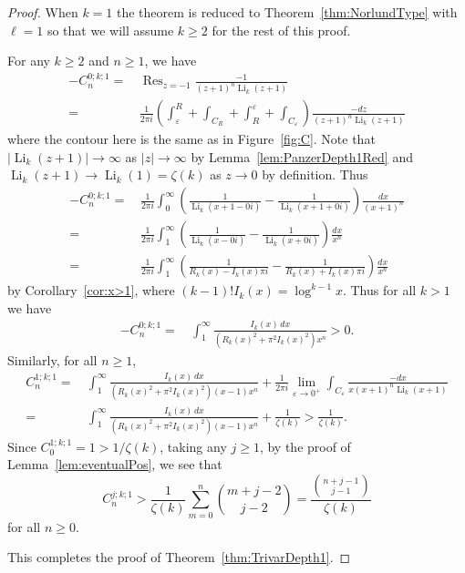 \documentclass[11pt]{article}
\newcommand\eps{{\varepsilon}}
\DeclareMathOperator{\Li}{Li}
\DeclareMathOperator{\Res}{Res}
\theoremstyle{plain}
\theoremstyle{definition}
\begin{document}
\begin{proof}
When $k=1$ the theorem is reduced to Theorem~\ref{thm:NorlundType} with $\ell=1$ so that we will assume $k\ge 2$ for the rest of this proof.

For any $k\ge 2$ and $n\ge 1$, we have
\begin{align*}
-C_{n}^{0;k;1}= &\, \Res_{z=-1} \frac{-1}{(z+1)^n\Li_k(z+1)}   \\
=&\, \frac{1}{2\pi i}\left( \int_\eps^R +\int_{C_R}+\int_R^\eps+ \int_{C_\eps} \right) \frac{-dz}{(z+1)^n\Li_k(z+1)}
\end{align*}
where the contour here is the same as in Figure~\ref{fig:C}. Note that $|\Li_k(z+1)|\to \infty$ as $|z|\to \infty$ by Lemma~\ref{lem:PanzerDepth1Red}
and $\Li_k(z+1)\to \Li_k(1)=\zeta(k)$ as $z\to 0$ by definition. Thus
\begin{align*}
-C_{n}^{0;k;1}=&\, \frac{1}{2\pi i} \int_0^\infty \left(\frac{1}{\Li_k(x+1-0i)}-\frac{1}{\Li_k(x+1+0i)}  \right)\frac{dx}{(x+1)^n}\\
 =&\, \frac{1}{2\pi i} \int_1^\infty \left(\frac{1}{\Li_k(x-0i)}-\frac{1}{\Li_k(x+0i)}  \right)\frac{dx}{x^n}\\
=&\, \frac{1}{2\pi i} \int_1^\infty \left(\frac{1}{R_k(x)-I_k(x)\pi i}-\frac{1}{R_k(x)+I_k(x)\pi i}  \right)\frac{dx}{x^n}
\end{align*}
by Corollary~\ref{cor:x>1}, where $(k-1)! I_k(x)=\log^{k-1} x$.
Thus for all $k>1$ we have
\begin{align*}
-C_{n}^{0;k;1}=&\, \int_1^\infty\frac{I_k(x)\, dx}{(R_k(x)^2+\pi^2 I_k(x)^2)x^n}>0.
\end{align*}
Similarly, for all $n\ge 1$,
\begin{align*}
C_{n}^{1;k;1}=&\, \int_1^\infty\frac{I_k(x)\, dx}{(R_k(x)^2+\pi^2 I_k(x)^2)(x-1) x^n}+\frac{1}{2\pi i}\lim_{\eps\to 0^+}\int_{C_\eps} \frac{-dx}{x(x+1)^n\Li_k(x+1)}\\
=&\, \int_1^\infty\frac{I_k(x)\, dx}{(R_k(x)^2+\pi^2 I_k(x)^2)(x-1) x^n}+\frac{1}{\zeta(k)}
>\frac{1}{\zeta(k)}.
\end{align*}
Since $C_{0}^{1;k;1}=1>1/\zeta(k)$,
taking any $j\ge 1$, by the proof of Lemma~\ref{lem:eventualPos}, we see that
\begin{equation*}
C_{n}^{j;k;1}>\frac{1}{\zeta(k)}\sum_{m=0}^n \binom{m+j-2}{j-2} =\frac{\binom{n+j-1}{j-1}}{\zeta(k)}
\end{equation*}
for all $n\ge 0$.

This completes the proof of Theorem~\ref{thm:TrivarDepth1}.
\end{proof}
\end{document}
